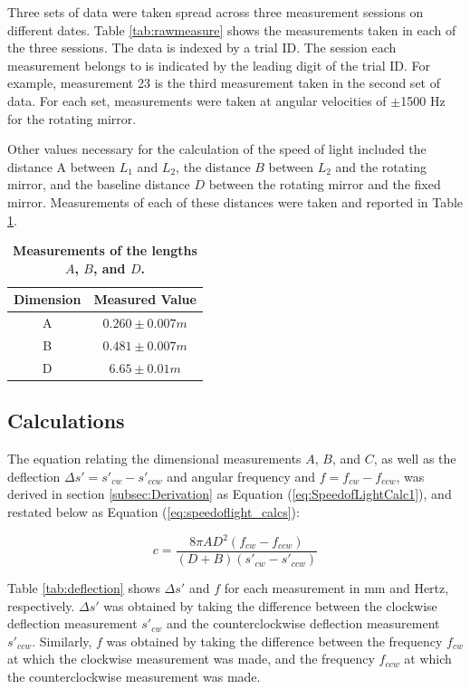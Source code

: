 \documentclass[twocolumn]{article}
\begin{document}
	Three sets of data were taken spread across three measurement sessions on different dates. 
	Table \ref{tab:rawmeasure} shows the measurements taken in each of the three sessions.
	The data is indexed by a trial ID. 
	The session each measurement belongs to is indicated by the leading digit of the trial ID. 
	For example, measurement 23 is the third measurement taken in the second set of data.
	For each set, measurements were taken at angular velocities of $\pm$1500 Hz for the rotating mirror. 
	
	Other values necessary for the calculation of the speed of light included the distance A between $L_1$ and $L_2$, the distance $B$ between $L_2$ and the rotating mirror, and the baseline distance $D$ between the rotating mirror and the fixed mirror. Measurements of each of these distances were taken and reported in Table \ref{tab:distances}.
		
	\begin{table}[t]
		\centering
		\begin{tabular}{c|c}
			Dimension	&	Measured Value	\\ \hline
			A	&	$0.260\pm0.007m$	\\
			B	&	$0.481\pm0.007m$	\\
			D	&	$6.65\pm0.01m$	\\
		\end{tabular}
		\caption{\textbf{Measurements of the lengths $A$, $B$, and $D$.}}
		\label{tab:distances}
	\end{table}
	
	
	\subsection{Calculations} \label{subsec:Calculations}
	The equation relating the dimensional measurements $A$, $B$, and $C$, as well as the deflection $\Delta s' = s'_{cw} - s'_{ccw}$ and angular frequency  and $f = f_{cw} -f_{ccw}$, was derived in section \ref{subsec:Derivation} as Equation (\ref{eq:SpeedofLightCalc1}), and restated below as Equation (\ref{eq:speedoflight_calcs}):
	
	\begin{equation} \label{eq:speedoflight_calcs}
	c = \frac{ 8\pi AD^2 (f_{cw} - f_{ccw})}
	{ (D + B) (s'_{cw} - s'_{ccw})}
	\end{equation}
	
	Table \ref{tab:deflection} shows $\Delta s'$ and $f$ for each measurement in mm and Hertz, respectively.
	$\Delta s'$ was obtained by taking the difference between the clockwise deflection measurement $s'_{cw}$ and the counterclockwise deflection measurement $s'_{ccw}$.
	Similarly, $f$ was obtained by taking the difference between the frequency $f_{cw}$ at which the clockwise measurement was made, and the frequency $f_{ccw}$ at which the counterclockwise measurement was made.
	
\end{document}
